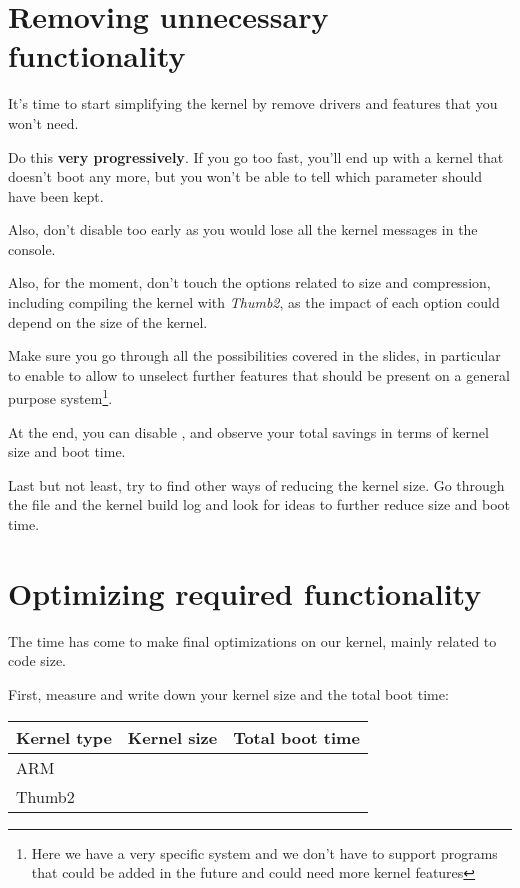 \section{Removing unnecessary functionality}

It's time to start simplifying the kernel by remove drivers and features
that you won't need.

Do this {\bf very progressively}. If you go too fast, you'll end up with a
kernel that doesn't boot any more, but you won't be able to tell which
parameter should have been kept.

Also, don't disable  too early
as you would lose all the kernel messages in the console.

Also, for the moment, don't touch the options related to size and
compression, including compiling the kernel with {\em Thumb2}, as the
impact of each option could depend on the size of the kernel.

Make sure you go through all the possibilities covered in the slides, in
particular to enable  to allow to unselect further
features that should be present on a general purpose
system\footnote{Here we have a very specific system and we don't have
to support programs that could be added in the future and could need
more kernel features}.

At the end, you can disable , and observe your
total savings in terms of kernel size and boot time.

Last but not least, try to find other ways of reducing the kernel size.
Go through the  file and the kernel build log and look for
ideas to further reduce size and boot time.

\section{Optimizing required functionality}

The time has come to make final optimizations on our kernel, mainly
related to code size.

First, measure and write down your kernel size and the total boot time:

\begin{tabular}{| l | l | r |}
  \hline
  Kernel type & Kernel size & Total boot time \\
  \hline
  \hline
  ARM & & \\
  \hline
  Thumb2 & & \\
  \hline
\end{tabular}


